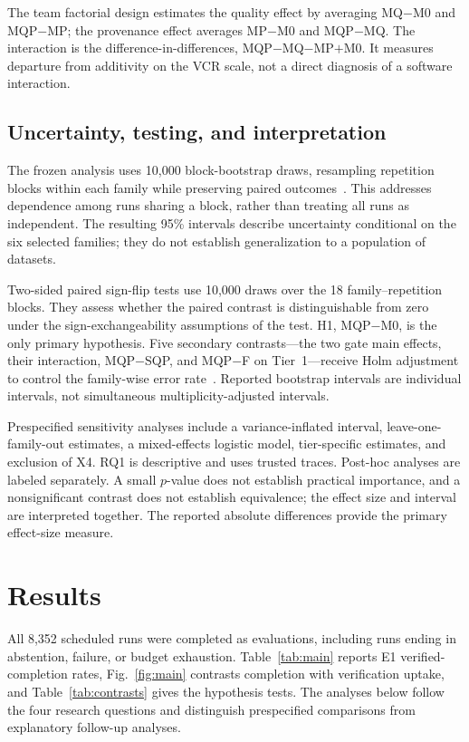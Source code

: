 \documentclass[conference]{IEEEtran}
\newcommand{\sys}[1]{\textsf{#1}}
\begin{document}
The team factorial design estimates the quality effect by averaging \sys{MQ}$-$\sys{M0} and \sys{MQP}$-$\sys{MP}; the provenance effect averages \sys{MP}$-$\sys{M0} and \sys{MQP}$-$\sys{MQ}. The interaction is the difference-in-differences, \sys{MQP}$-$\sys{MQ}$-$\sys{MP}$+$\sys{M0}. It measures departure from additivity on the VCR scale, not a direct diagnosis of a software interaction.

\subsection{Uncertainty, testing, and interpretation}
The frozen analysis uses 10,000 block-bootstrap draws, resampling repetition blocks within each family while preserving paired outcomes~\cite{efron1979bootstrap,saravanan2020hierarchical}. This addresses dependence among runs sharing a block, rather than treating all runs as independent. The resulting 95\% intervals describe uncertainty conditional on the six selected families; they do not establish generalization to a population of datasets.

Two-sided paired sign-flip tests use 10,000 draws over the 18 family--repetition blocks. They assess whether the paired contrast is distinguishable from zero under the sign-exchangeability assumptions of the test. H1, \sys{MQP}$-$\sys{M0}, is the only primary hypothesis. Five secondary contrasts---the two gate main effects, their interaction, \sys{MQP}$-$\sys{SQP}, and \sys{MQP}$-$\sys{F} on Tier~1---receive Holm adjustment to control the family-wise error rate~\cite{holm1979}. Reported bootstrap intervals are individual intervals, not simultaneous multiplicity-adjusted intervals.

Prespecified sensitivity analyses include a variance-inflated interval, leave-one-family-out estimates, a mixed-effects logistic model, tier-specific estimates, and exclusion of X4. RQ1 is descriptive and uses trusted traces. Post-hoc analyses are labeled separately. A small $p$-value does not establish practical importance, and a nonsignificant contrast does not establish equivalence; the effect size and interval are interpreted together. The reported absolute differences provide the primary effect-size measure.

\section{Results}
\label{sec:results}
All 8,352 scheduled runs were completed as evaluations, including runs ending in abstention, failure, or budget exhaustion. Table~\ref{tab:main} reports E1 verified-completion rates, Fig.~\ref{fig:main} contrasts completion with verification uptake, and Table~\ref{tab:contrasts} gives the hypothesis tests. The analyses below follow the four research questions and distinguish prespecified comparisons from explanatory follow-up analyses.
\end{document}
